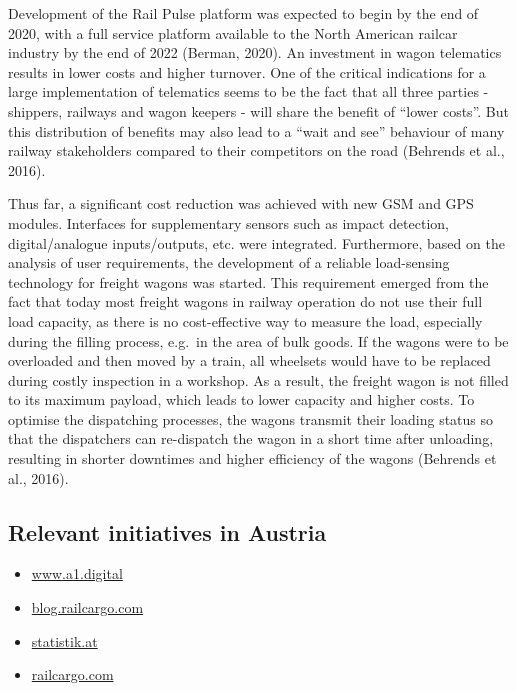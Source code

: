 \documentclass[
]{book}
\providecommand{\tightlist}{%
  \setlength{\itemsep}{0pt}\setlength{\parskip}{0pt}}
\begin{document}
Development of the Rail Pulse platform was expected to begin by the end of 2020, with a full service platform available to the North American railcar industry by the end of 2022 (Berman, 2020).
An investment in wagon telematics results in lower costs and higher turnover. One of the critical indications for a large implementation of telematics seems to be the fact that all three parties - shippers, railways and wagon keepers - will share the benefit of ``lower costs''. But this distribution of benefits may also lead to a ``wait and see'' behaviour of many railway stakeholders compared to their competitors on the road (Behrends et al., 2016).

Thus far, a significant cost reduction was achieved with new GSM and GPS modules. Interfaces for supplementary sensors such as impact detection, digital/analogue inputs/outputs, etc. were integrated. Furthermore, based on the analysis of user requirements, the development of a reliable load-sensing technology for freight wagons was started. This requirement emerged from the fact that today most freight wagons in railway operation do not use their full load capacity, as there is no cost-effective way to measure the load, especially during the filling process, e.g.~in the area of bulk goods. If the wagons were to be overloaded and then moved by a train, all wheelsets would have to be replaced during costly inspection in a workshop. As a result, the freight wagon is not filled to its maximum payload, which leads to lower capacity and higher costs. To optimise the dispatching processes, the wagons transmit their loading status so that the dispatchers can re-dispatch the wagon in a short time after unloading, resulting in shorter downtimes and higher efficiency of the wagons (Behrends et al., 2016).

\hypertarget{relevant-initiatives-in-austria-26}{%
\subsection*{Relevant initiatives in Austria}\label{relevant-initiatives-in-austria-26}}

\begin{itemize}
\tightlist
\item
  \href{https://www.a1.digital/en-de/about-a1-digital/Press-Releases/OBB-freight-trains-become-smart-with-A1-Digital/}{www.a1.digital}
\item
  \href{https://blog.railcargo.com/en/artikel/smart-cargo-erstmontage}{blog.railcargo.com}
\item
  \href{https://www.statistik.at/web_de/statistiken/energie_umwelt_innovation_mobilitaet/verkehr/schiene/gueterverkehr/index.html}{statistik.at}
\item
  \href{https://www.railcargo.com/de/unternehmen/international/oesterreich}{railcargo.com}
\end{itemize}
\end{document}

